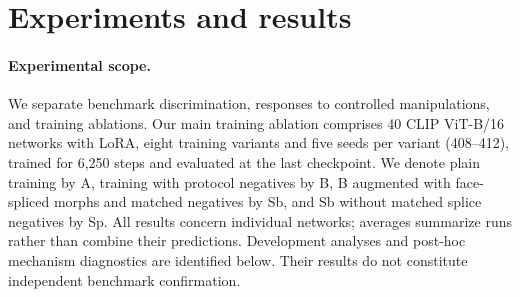 \section{Experiments and results}
\label{sec:results}


\paragraph{Experimental scope.}
We separate benchmark discrimination, responses to controlled manipulations, and training ablations. Our main training ablation comprises 40 CLIP ViT-B/16 networks with LoRA, eight training variants and five seeds per variant (408--412), trained for 6,250 steps and evaluated at the last checkpoint. We denote plain training by A, training with protocol negatives by B, B augmented with face-spliced morphs and matched negatives by Sb, and Sb without matched splice negatives by Sp. All results concern individual networks; averages summarize runs rather than combine their predictions. Development analyses and post-hoc mechanism diagnostics are identified below. Their results do not constitute independent benchmark confirmation.

